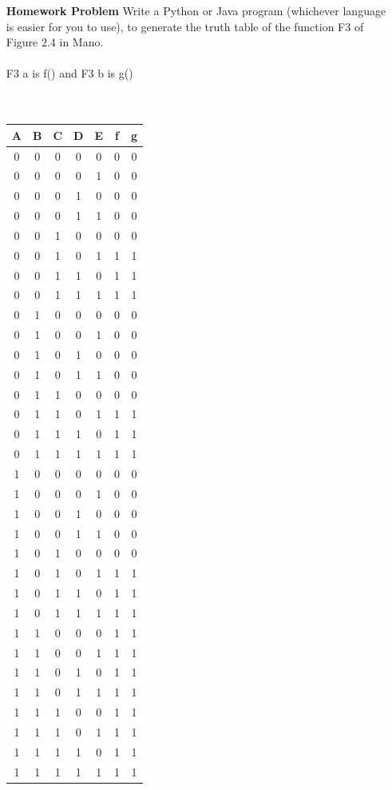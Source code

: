 \documentclass{article}
\begin{document}
\begin{itemize}
	\item [\textbf{Homework Problem}] Write a Python or Java program (whichever language is easier for you to use), to generate the truth table of the function F3 of Figure 2.4 in Mano.\\\\
	F3 a is f() and F3 b is g()\\\\
	\\
	\begin{tabular}{  c  c  c  c  c | c  c }
		A & B & C & D & E & f & g\\ \hline
		0 & 0 & 0 & 0 & 0 & 0 & 0\\
		0 & 0 & 0 & 0 & 1 & 0 & 0\\
		0 & 0 & 0 & 1 & 0 & 0 & 0\\
		0 & 0 & 0 & 1 & 1 & 0 & 0\\
		0 & 0 & 1 & 0 & 0 & 0 & 0\\
		0 & 0 & 1 & 0 & 1 & 1 & 1\\
		0 & 0 & 1 & 1 & 0 & 1 & 1\\
		0 & 0 & 1 & 1 & 1 & 1 & 1\\
		0 & 1 & 0 & 0 & 0 & 0 & 0\\
		0 & 1 & 0 & 0 & 1 & 0 & 0\\
		0 & 1 & 0 & 1 & 0 & 0 & 0\\
		0 & 1 & 0 & 1 & 1 & 0 & 0\\
		0 & 1 & 1 & 0 & 0 & 0 & 0\\
		0 & 1 & 1 & 0 & 1 & 1 & 1\\
		0 & 1 & 1 & 1 & 0 & 1 & 1\\
		0 & 1 & 1 & 1 & 1 & 1 & 1\\
		1 & 0 & 0 & 0 & 0 & 0 & 0\\
		1 & 0 & 0 & 0 & 1 & 0 & 0\\
		1 & 0 & 0 & 1 & 0 & 0 & 0\\
		1 & 0 & 0 & 1 & 1 & 0 & 0\\
		1 & 0 & 1 & 0 & 0 & 0 & 0\\
		1 & 0 & 1 & 0 & 1 & 1 & 1\\
		1 & 0 & 1 & 1 & 0 & 1 & 1\\
		1 & 0 & 1 & 1 & 1 & 1 & 1\\
		1 & 1 & 0 & 0 & 0 & 1 & 1\\
		1 & 1 & 0 & 0 & 1 & 1 & 1\\
		1 & 1 & 0 & 1 & 0 & 1 & 1\\
		1 & 1 & 0 & 1 & 1 & 1 & 1\\
		1 & 1 & 1 & 0 & 0 & 1 & 1\\
		1 & 1 & 1 & 0 & 1 & 1 & 1\\
		1 & 1 & 1 & 1 & 0 & 1 & 1\\
		1 & 1 & 1 & 1 & 1 & 1 & 1\\
	\end{tabular}

\end{itemize}
\end{document}
